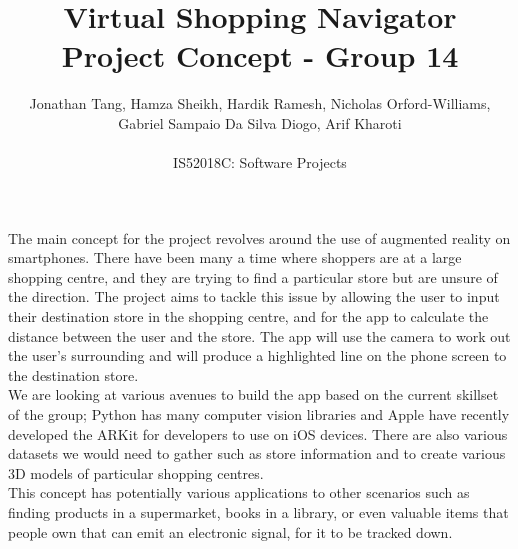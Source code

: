 \documentclass[12pt]{article}
\begin{document}
 
\title{\textbf{Virtual Shopping Navigator}\\Project Concept - Group 14}
\author{Jonathan Tang, Hamza Sheikh, Hardik Ramesh, Nicholas Orford-Williams,\\
Gabriel Sampaio Da Silva Diogo, Arif Kharoti\\
\\
IS52018C: Software Projects}
 
\maketitle

The main concept for the project revolves around the use of augmented reality on smartphones. There have been many a time where shoppers are at a large shopping centre, and they are trying to find a particular store but are unsure of the direction. The project aims to tackle this issue by allowing the user to input their destination store in the shopping centre, and for the app to calculate the distance between the user and the store. The app will use the camera to work out the user's
surrounding and will produce a highlighted line on the phone screen to the destination store.\\

We are looking at various avenues to build the app based on the current skillset of the group; Python has many computer vision libraries and Apple have recently developed the ARKit for developers to use on iOS devices. There are also various datasets we would need to gather such as store information and to create various 3D models of particular shopping centres.\\

This concept has potentially various applications to other scenarios such as finding products in a supermarket, books in a library, or even valuable items that people own that can emit an electronic signal, for it to be tracked down.
\end{document}
